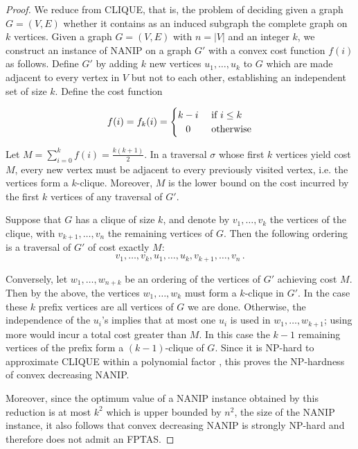 \begin{proof} 

We reduce from CLIQUE, that is, the problem of deciding given a graph $G =
(V,E)$ whether it contains as an induced subgraph the complete graph on $k$
vertices.  Given a graph $G = (V,E)$ with $n=|V|$ and an integer $k$, we
construct an instance of NANIP on a graph $G'$ with a convex cost function
$f(i)$ as follows.  Define $G'$ by adding $k$ new vertices $u_1, \dots, u_k$ to
$G$ which are made adjacent to every vertex in $V$ but not to each other,
establishing an independent set of size $k$.  Define the cost function 

\[
 f(i) = f_k(i) =
  \begin{cases} 
      \hfill k-i    \hfill & \text{ if $i \leq k$} \\
      \hfill 0          \hfill & \text{ otherwise} \\
  \end{cases}
\]


Let $M = \sum_{i=0}^{k} f(i)=\frac{k(k+1)}2$.  In a traversal $\sigma$ whose
first $k$ vertices yield cost $M$, every new vertex must be adjacent to every
previously visited vertex, i.e. the vertices form a $k$-clique.  Moreover, $M$
is the lower bound on the cost incurred by the first $k$ vertices of any
traversal of $G'$. 

Suppose that $G$ has a clique of size $k$, and denote by $v_1, \dots, v_k$ the
vertices of the clique, with $v_{k+1}, \dots, v_n$ the remaining vertices of
$G$. Then the following ordering is a traversal of $G'$ of cost exactly $M$:
\[
   v_1, \dots, v_k, u_1, \dots, u_k, v_{k+1}, \dots, v_n \,.
\]

Conversely, let $w_1, \dots, w_{n+k}$ be an ordering of the vertices of $G'$
achieving cost $M$.  Then by the above, the vertices $w_1, \dots, w_{k}$ must
form a $k$-clique in $G'$.  In the case these $k$ prefix vertices are all
vertices of $G$ we are done.  Otherwise, the independence of the $u_i$'s
implies that at most one $u_i$ is used in $w_1, \dots, w_{k+1}$; using more
would incur a total cost greater than $M$.  In this case the $k-1$ remaining
vertices of the prefix form a $(k-1)$-clique of $G$.
Since it is NP-hard to approximate CLIQUE within a polynomial factor
\cite{Zuckerman06}, this proves the NP-hardness of convex decreasing NANIP.

Moreover, since the optimum value of a NANIP instance obtained by this reduction
is at most $k^2$ which is upper bounded by $n^2$, the size of the NANIP instance,
it also follows that convex decreasing NANIP is strongly NP-hard and therefore
does not admit an FPTAS. 

\end{proof}

